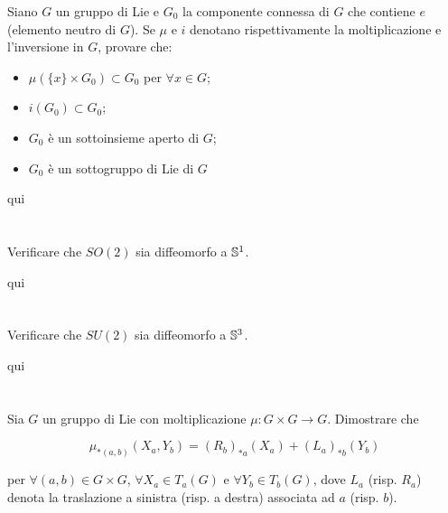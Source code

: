 \begin{tcolorbox}
	Siano $ G $ un gruppo di Lie e $ G_{0} $ la componente connessa di $ G $ che contiene $ e $ (elemento neutro di $ G $). Se $ \mu $ e $ i $ denotano rispettivamente la moltiplicazione e l'inversione in $ G $, provare che:
	
	\begin{itemize}
		\item $ \mu(\{x\} \times G_{0}) \subset G_{0} $ per $ \forall x \in G $;
		
		\item $ i(G_{0}) \subset G_{0} $;
		
		\item $ G_{0} $ è un sottoinsieme aperto di $ G $;
		
		\item $ G_{0} $ è un sottogruppo di Lie di $ G $
	\end{itemize}
\end{tcolorbox}

qui

\tocless\section{}\label{BONUS3-1}

\begin{tcolorbox}
	Verificare che $ SO(2) $ sia diffeomorfo a $ \S^{1} $.
\end{tcolorbox}

qui

\tocless\section{}\label{BONUS3-2}

\begin{tcolorbox}
	Verificare che $ SU(2) $ sia diffeomorfo a $ \S^{3} $.
\end{tcolorbox}

qui

\tocless\section{}\label{es3-7}

\begin{tcolorbox}
	Sia $ G $ un gruppo di Lie con moltiplicazione $ \mu : G \times G \to G $. Dimostrare che
	
	\begin{equation}
		\mu_{*(a,b)}(X_{a},Y_{b}) = (R_{b})_{*a}(X_{a}) + (L_{a})_{*b}(Y_{b})
	\end{equation}

	per $ \forall (a,b) \in G \times G $, $ \forall X_{a} \in T_{a}(G) $ e $ \forall Y_{b} \in T_{b}(G) $, dove $ L_{a} $ (risp. $ R_{a} $) denota la traslazione a sinistra (risp. a destra) associata ad $ a $ (risp. $ b $).
\end{tcolorbox}

